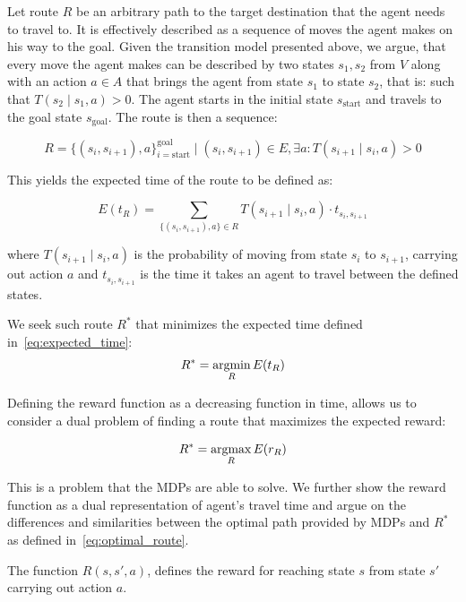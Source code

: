 Let route $R$ be an arbitrary path to the target destination that the agent
needs to travel to. It is effectively described as a sequence of moves the
agent makes on his way to the goal. Given the transition model presented
above, we argue, that every move the agent makes can be described by two
states $s_1, s_2$ from $V$ along with an action $a \in A$ that brings the
agent from state $s_1$ to state $s_2$, that is: such that $T(s_2 \mid s_1, a)
> 0$. The agent starts in the initial state $s_\mathrm{start}$ and travels to
the goal state $s_\mathrm{goal}$. The route is then a sequence:

\begin{equation}
R = \{(s_i, s_{i+1}), a \}_{i=\mathrm{start}}^{\mathrm{goal}} \mid (s_i, s_{i+1}) \in E, \exists a: T(s_{i+1} \mid s_i, a) > 0
\end{equation}

This yields the expected time of the route to be defined as:

\begin{equation}
\label{eq:expected_time}
E(t_R) = \sum_{\{(s_i, s_{i+1}), a \} \in R} T(s_{i+1} \mid s_i, a) \cdot t_{s_i, s_{i+1}}
\end{equation}

where $T(s_{i+1} \mid s_i, a)$ is the probability of moving from state $s_i$
to $s_{i+1}$, carrying out action $a$ and $t_{s_i, s_{i+1}}$ is the time it
takes an agent to travel between the defined states.

We seek such route $R^*$ that minimizes the expected time defined in~\eqref{eq:expected_time}:
\begin{equation}
\label{eq:optimal_route}
    R^* = \mathop{\rm argmin}_R E(t_R)
\end{equation}

Defining the reward function as a decreasing function in time, allows us to
consider a dual problem of finding a route that maximizes the expected reward:

\begin{equation}
    R^* = \mathop{\rm argmax}_R E(r_R)
\end{equation}

This is a problem that the MDPs are able to solve. We further show the reward
function as a dual representation of agent's travel time and argue on the
differences and similarities between the optimal path provided by MDPs and
$R^*$ as defined in~\eqref{eq:optimal_route}.

The function $R(s, s', a)$, defines the reward for reaching state $s$ from
state $s'$ carrying out action $a$.

